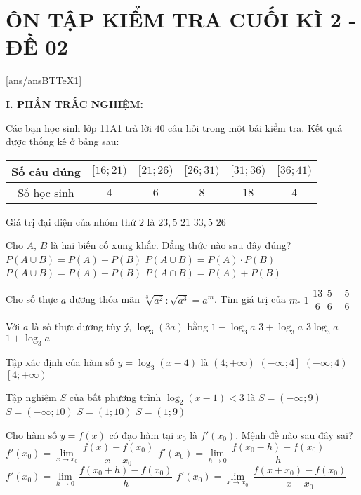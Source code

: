 \section*{ÔN TẬP KIỂM TRA CUỐI KÌ 2 - ĐỀ 02}
\setcounter{ex}{0}\setcounter{bt}{0}
[ans/ansBTTeX1]

\noindent\textbf{I. PHẦN TRẮC NGHIỆM:}
\begin{ex}
Các bạn học sinh lớp 11A1 trả lời $40$ câu hỏi trong một bải kiểm tra. Kết quả được thống kê ở bảng sau:
\begin{center}
\begin{tabular}{|c|c|c|c|c|c|}
\hline
Số câu đúng & $[16;21)$ & $[21;26)$ & $[26;31)$ & $[31;36)$& $[36;41)$ \\
\hline
Số học sinh & $4$ & $6$ & $8$ & $18$ & $4$\\
\hline
\end{tabular}
\end{center}
Giá trị đại diện của nhóm thứ $2$ là
\choice
{\True $23{,}5$}
{$21$}
{$33{,}5$}
{$26$}
\end{ex}
\begin{ex}
Cho $A$, $B$ là hai biến cố xung khắc. Đẳng thức nào sau đây đúng?
\choice
{\True $P\left(A\cup B\right)=P(A)+P(B)$}
{$P\left(A\cup B\right)=P(A) \cdot P(B)$}
{$P\left(A\cup B\right)=P(A)-P(B)$}
{$P\left(A\cap B\right)=P(A)+P(B)$
}
\end{ex}
\begin{ex}
Cho số thực $a$ dương thỏa mãn $\sqrt[3]{a^2}\colon \sqrt{a^3}=a^m$. Tìm giá trị của $m$.
\choice
{$1$}
{$\dfrac{13}{6}$}
{$\dfrac{5}{6}$}
{\True $-\dfrac{5}{6}$}
\end{ex}
\begin{ex}
Với $a$ là số thực dương tùy ý, $\log_3(3a)$ bằng
\choice
{$1-\log_3a$}
{$3+\log_3a$}
{$3\log_3a$}
{\True $1+\log_3a$}
\end{ex}
\begin{ex}
Tập xác định của hàm số $y=\log_3(x-4)$ là
\choice
{\True $\left(4;+\infty\right)$}
{$\left(-\infty ;4\right]$}
{$\left(-\infty ;4\right)$}
{$\left[4;+\infty\right)$}
\end{ex}
\begin{ex}
Tập nghiệm $S$ của bất phương trình $\log_2(x-1)<3$ là
\choice
{$S=\left(-\infty ;9\right)$}
{$S=\left(-\infty ;10\right)$}
{$S=(1;10)$}
{\True $S=(1;9)$}
\end{ex}
\begin{ex}
Cho hàm số $y=f(x)$ có đạo hàm tại $x_0$ là $f'\left(x_0\right)$. Mệnh đề nào sau đây sai?
\choice
{$f'\left(x_0\right)= \lim \limits_{x\to x_0} \,\dfrac{f(x)-f\left(x_0\right)}{x-x_0}$}
{$f'\left(x_0\right)= \lim \limits_{h \to 0} \,\dfrac{f\left(x_0-h\right)-f\left(x_0\right)}{h}$}
{$f'\left(x_0\right)= \lim \limits_{h\to 0} \,\dfrac{f\left(x_0+h\right)-f\left(x_0\right)}{h}$}
{\True $f'\left(x_0\right)= \lim \limits_{x\to x_0} \,\dfrac{f\left(x+x_0\right)-f\left(x_0\right)}{x-x_0}$}
\end{ex}
